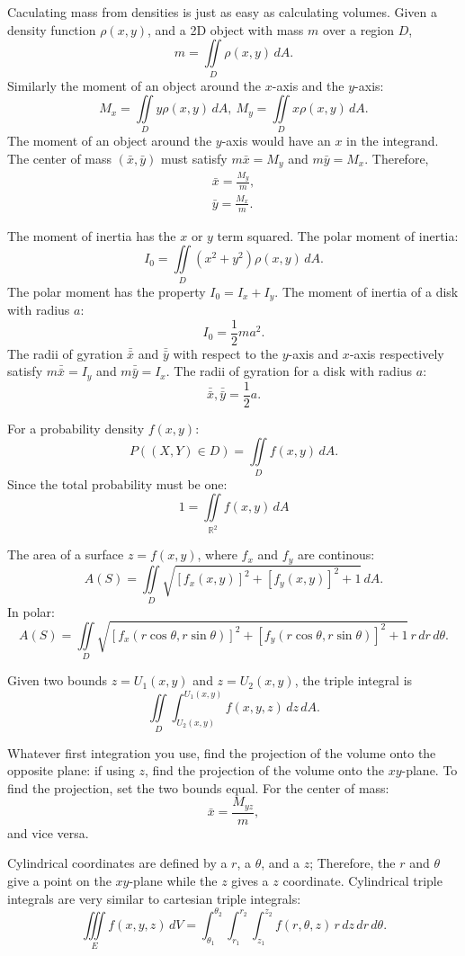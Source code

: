\documentclass{article}
\begin{document}
Caculating mass from densities is just as easy as calculating volumes.
Given a density function $\rho (x,y)$, and a 2D object with mass $m$
over a region $D$,
\[
m = \iint \limits_D \rho(x,y) \, dA.
\]
Similarly the moment of an object around the $x$-axis and the $y$-axis:
\[
M_x = \iint \limits_D y \rho(x,y) \, dA, \
M_y = \iint \limits_D x \rho(x,y) \, dA.
 \]
The moment of an object around the $y$-axis would have an $x$ in the integrand.
The center of mass $(\bar{x}, \bar{y})$ must satisfy $m\bar{x} = M_y$ and
$m\bar{y} = M_x$. Therefore, 
\begin{align}
    \bar{x} = \frac{M_y}{m},\nonumber \\ 
    \bar{y} = \frac{M_x}{m}. \nonumber
\end{align}

The moment of inertia has the $x$ or $y$ term squared. The polar moment
of inertia:
\[
I_0 = \iint \limits_D (x^2 + y^2) \rho(x,y) \, dA.
\]
The polar moment has the property $I_0 = I_x + I_y$. The moment of 
inertia of a disk with radius $a$:
\[
I_0 = \frac{1}{2}ma^2.
\]
The radii of gyration $\bar{\bar{x}}$ and $\bar{\bar{y}}$ with respect to
the $y$-axis and $x$-axis respectively satisfy $m\bar{\bar{x}}=I_y$ and 
$m\bar{\bar{y}}=I_x$. The radii of gyration for a disk with radius $a$:
\[
    \bar{\bar{x}}, \bar{\bar{y}} = \frac{1}{2}a.
\]

For a probability density $f(x,y)$:
\[
P((X,Y) \in D) = \iint \limits_D f(x,y) \, dA.
\]
Since the total probability must be one:
\[
1 = \iint \limits_{\mathbb{R}^2} f(x,y) \, dA
\]
 
The area of a surface $z=f(x,y)$, where $f_x$ and $f_y$ are continous:
\[
A(S) = \iint \limits_D \sqrt{[f_x(x,y)]^2 + [f_y(x,y)]^2+1} \, dA.
\]
In polar:
\[
A(S) = \iint  \limits_D \sqrt{[f_x(r\cos\theta,r\sin\theta)]^2 + [f_y(r\cos\theta,r\sin\theta)]^2+1} \, r\,dr \,d\theta.
\]

Given two bounds $z = U_1(x,y)$ and $z = U_2(x,y)$, the triple integral is
\[
\iint \limits_D \int_{U_2(x,y)}^{U_1(x,y)} f(x,y,z) \, dz \, dA.
\]

Whatever first integration you use, find the projection of the volume onto the opposite plane:
if using $z$, find the projection of the volume onto the $xy$-plane. To find
the projection, set the two bounds equal. For the center of mass:
\[
\bar{x} = \frac{M_{yz}}{m},
\] 
and vice versa.

Cylindrical coordinates are defined by a $r$, a $\theta$, and a $z$; Therefore, the $r$
and $\theta$ give a point on the $xy$-plane while the $z$ gives a $z$ coordinate.
Cylindrical triple integrals are very similar to cartesian triple integrals:
\[
    \iiint \limits_E f(x,y,z) \, dV = \int_{\theta_1}^{\theta_2} \int_{r_1}^{r_2} \int_{z_1}^{z_2} f(r,\theta,z) \, r \, dz \, dr \, d\theta.
\]
\end{document}
